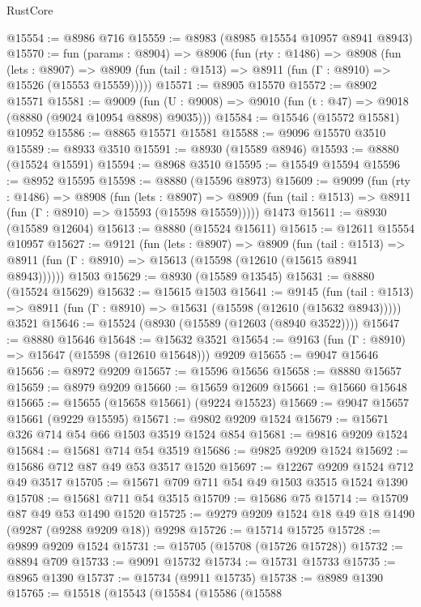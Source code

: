 \begin{lexlean}{RustCore}
\begin{coremodule}
@15554 := @8986 @716
@15559 := @8983 (@8985 @15554 @10957 @8941 @8943)
@15570 := fun (params : @8904) =>
  @8906
    (fun (rty : @1486) =>
    @8908
      (fun (lets : @8907) =>
      @8909 (fun (tail : @1513) => @8911 (fun (Γ : @8910) => @15526 (@15553 @15559)))))
@15571 := @8905 @15570
@15572 := @8902 @15571
@15581 := @9009
    (fun (U : @9008) => @9010 (fun (t : @47) => @9018 (@8880 (@9024 @10954 @8898) @9035)))
@15584 := @15546 (@15572 @15581) @10952
@15586 := @8865 @15571 @15581
@15588 := @9096 @15570 @3510
@15589 := @8933 @3510
@15591 := @8930 (@15589 @8946)
@15593 := @8880 (@15524 @15591)
@15594 := @8968 @3510
@15595 := @15549 @15594
@15596 := @8952 @15595
@15598 := @8880 (@15596 @8973)
@15609 := @9099
    (fun (rty : @1486) =>
    @8908
      (fun (lets : @8907) =>
      @8909 (fun (tail : @1513) => @8911 (fun (Γ : @8910) => @15593 (@15598 @15559)))))
    @1473
@15611 := @8930 (@15589 @12604)
@15613 := @8880 (@15524 @15611)
@15615 := @12611 @15554 @10957
@15627 := @9121
    (fun (lets : @8907) =>
    @8909
      (fun (tail : @1513) =>
      @8911 (fun (Γ : @8910) => @15613 (@15598 (@12610 (@15615 @8941 @8943))))))
    @1503
@15629 := @8930 (@15589 @13545)
@15631 := @8880 (@15524 @15629)
@15632 := @15615 @1503
@15641 := @9145
    (fun (tail : @1513) => @8911 (fun (Γ : @8910) => @15631 (@15598 (@12610 (@15632 @8943)))))
    @3521
@15646 := @15524 (@8930 (@15589 (@12603 (@8940 @3522))))
@15647 := @8880 @15646
@15648 := @15632 @3521
@15654 := @9163 (fun (Γ : @8910) => @15647 (@15598 (@12610 @15648))) @9209
@15655 := @9047 @15646
@15656 := @8972 @9209
@15657 := @15596 @15656
@15658 := @8880 @15657
@15659 := @8979 @9209
@15660 := @15659 @12609
@15661 := @15660 @15648
@15665 := @15655 (@15658 @15661) (@9224 @15523)
@15669 := @9047 @15657 @15661 (@9229 @15595)
@15671 := @9802 @9209 @1524
@15679 := @15671 @326 @714 @54 @66 @1503 @3519 @1524 @854
@15681 := @9816 @9209 @1524
@15684 := @15681 @714 @54 @3519
@15686 := @9825 @9209 @1524
@15692 := @15686 @712 @87 @49 @53 @3517 @1520
@15697 := @12267 @9209 @1524 @712 @49 @3517
@15705 := @15671 @709 @711 @54 @49 @1503 @3515 @1524 @1390
@15708 := @15681 @711 @54 @3515
@15709 := @15686 @75
@15714 := @15709 @87 @49 @53 @1490 @1520
@15725 := @9279 @9209 @1524 @18 @49 @18 @1490 (@9287 (@9288 @9209 @18)) @9298
@15726 := @15714 @15725
@15728 := @9899 @9209 @1524
@15731 := @15705 (@15708 (@15726 @15728))
@15732 := @8894 @709
@15733 := @9091 @15732
@15734 := @15731 @15733
@15735 := @8965 @1390
@15737 := @15734 (@9911 @15735)
@15738 := @8989 @1390
@15765 := @15518
    (@15543
      (@15584
        (@15586
          (@15588

\end{coremodule}
\end{lexlean}
